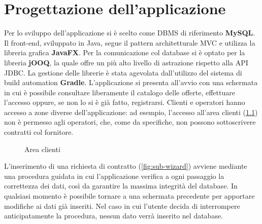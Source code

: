 \documentclass[a4paper,12pt]{report}
\begin{document}
\chapter{Progettazione dell'applicazione}
Per lo sviluppo dell'applicazione si è scelto come DBMS di riferimento \textbf{MySQL}. Il front-end, sviluppato in Java, segue il pattern architetturale MVC e utilizza la libreria grafica \textbf{JavaFX}. Per la comunicazione col database si è optato per la libreria \textbf{jOOQ}, la quale offre un più alto livello di astrazione rispetto alla API JDBC. La gestione delle librerie è stata agevolata dall'utilizzo del sistema di build automation \textbf{Gradle}.
\newline
L'applicazione si presenta all'avvio con una schermata in cui è possibile consultare liberamente il catalogo delle offerte, effettuare l'accesso oppure, se non lo si è già fatto, registrarsi. Clienti e operatori hanno accesso a zone diverse dell'applicazione: ad esempio, l'accesso all'area clienti (\cref{fig:user-area}) non è permesso agli operatori, che, come da specifiche, non possono sottoscrivere contratti col fornitore.

\begin{figure}[H]
    \centering{}
    \caption{Area clienti}
    \label{fig:user-area}
\end{figure}

L'inserimento di una richiesta di contratto (\cref{fig:sub-wizard}) avviene mediante una procedura guidata in cui l'applicazione verifica a ogni passaggio la correttezza dei dati, così da garantire la massima integrità del database. In qualsiasi momento è possibile tornare a una schermata precedente per apportare modifiche ai dati già inseriti. Nel caso in cui l'utente decida di interrompere anticipatamente la procedura, nessun dato verrà inserito nel database.
\end{document}
